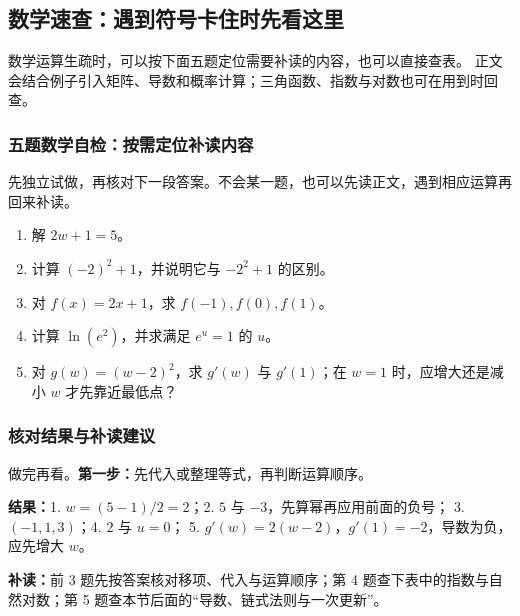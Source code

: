 \subsection{数学速查：遇到符号卡住时先看这里}
\label{app:math-tools}
数学运算生疏时，可以按下面五题定位需要补读的内容，也可以直接查表。
正文会结合例子引入矩阵、导数和概率计算；三角函数、指数与对数也可在用到时回查。

\subsubsection*{五题数学自检：按需定位补读内容}
\label{app:math-entry}
先独立试做，再核对下一段答案。不会某一题，也可以先读正文，遇到相应运算再回来补读。
\begin{enumerate}[itemsep=1pt,topsep=2pt]
\item 解 $2w+1=5$。
\item 计算 $(-2)^2+1$，并说明它与 $-2^2+1$ 的区别。
\item 对 $f(x)=2x+1$，求 $f(-1),f(0),f(1)$。
\item 计算 $\ln(e^2)$，并求满足 $e^u=1$ 的 $u$。
\item 对 $g(w)=(w-2)^2$，求 $g'(w)$ 与 $g'(1)$；在 $w=1$ 时，应增大还是减小 $w$ 才先靠近最低点？
\end{enumerate}

\subsubsection*{核对结果与补读建议}
\label{answer:math-entry}
做完再看。\textbf{第一步：}先代入或整理等式，再判断运算顺序。\par\nobreak
\textbf{结果：}1. $w=(5-1)/2=2$；2. $5$ 与 $-3$，先算幂再应用前面的负号；
3. $(-1,1,3)$；4. $2$ 与 $u=0$；
5. $g'(w)=2(w-2)$，$g'(1)=-2$，导数为负，应先增大 $w$。\par
\textbf{补读：}前 3 题先按答案核对移项、代入与运算顺序；第 4 题查下表中的指数与自然对数；第 5 题查本节后面的“导数、链式法则与一次更新”。


